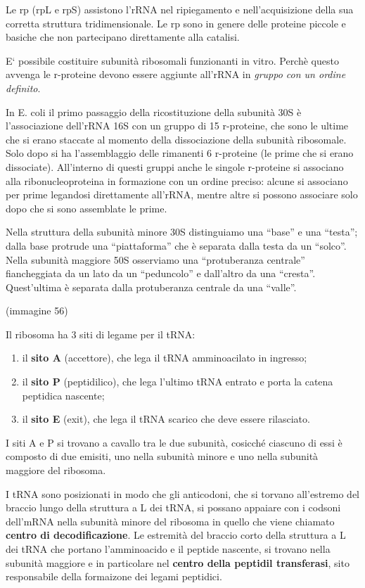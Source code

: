 \documentclass[]{article}
\begin{document}
Le rp (rpL e rpS) assistono l'rRNA nel ripiegamento e nell'acquisizione
della sua corretta struttura tridimensionale. Le rp sono in genere delle
proteine piccole e basiche che non partecipano direttamente alla
catalisi.

E` possibile costituire subunità ribosomali funzionanti in vitro. Perchè
questo avvenga le r-proteine devono essere aggiunte all'rRNA in
\emph{gruppo con un ordine definito}.

In E. coli il primo passaggio della ricostituzione della subunità 30S è
l'associazione dell'rRNA 16S con un gruppo di 15 r-proteine, che sono le
ultime che si erano staccate al momento della dissociazione della
subunità ribosomale. Solo dopo si ha l'assemblaggio delle rimanenti 6
r-proteine (le prime che si erano dissociate). All'interno di questi
gruppi anche le singole r-proteine si associano alla ribonucleoproteina
in formazione con un ordine preciso: alcune si associano per prime
legandosi direttamente all'rRNA, mentre altre si possono associare solo
dopo che si sono assemblate le prime.

Nella struttura della subunità minore 30S distinguiamo una ``base'' e
una ``testa''; dalla base protrude una ``piattaforma'' che è separata
dalla testa da un ``solco''. Nella subunità maggiore 50S osserviamo una
``protuberanza centrale'' fiancheggiata da un lato da un ``peduncolo'' e
dall'altro da una ``cresta''. Quest'ultima è separata dalla protuberanza
centrale da una ``valle''.

(immagine 56)

Il ribosoma ha 3 siti di legame per il tRNA:

\begin{enumerate}
\def\labelenumi{\arabic{enumi}.}
\itemsep1pt\parskip0pt
\item
  il \textbf{sito A} (accettore), che lega il tRNA amminoacilato in
  ingresso;
\item
  il \textbf{sito P} (peptidilico), che lega l'ultimo tRNA entrato e
  porta la catena peptidica nascente;
\item
  il \textbf{sito E} (exit), che lega il tRNA scarico che deve essere
  rilasciato.
\end{enumerate}

I siti A e P si trovano a cavallo tra le due subunità, cosicché ciascuno
di essi è composto di due emisiti, uno nella subunità minore e uno nella
subunità maggiore del ribosoma.

I tRNA sono posizionati in modo che gli anticodoni, che si torvano
all'estremo del braccio lungo della struttura a L dei tRNA, si possano
appaiare con i codsoni dell'mRNA nella subunità minore del ribosoma in
quello che viene chiamato \textbf{centro di decodificazione}. Le
estremità del braccio corto della struttura a L dei tRNA che portano
l'amminoacido e il peptide nascente, si trovano nella subunità maggiore
e in particolare nel \textbf{centro della peptidil transferasi}, sito
responsabile della formaizone dei legami peptidici.
\end{document}
